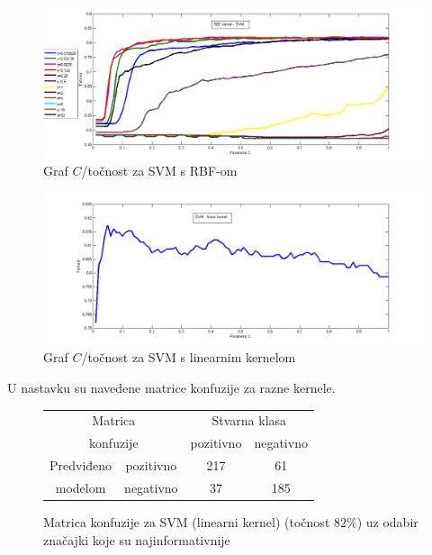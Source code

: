 \documentclass[conference]{IEEEtran}
\begin{document}
\begin{figure}[!ht]
\begin{minipage}{0.5\textwidth}
\centering
\includegraphics[width=\textwidth]{images/allRBF.png}
\caption{Graf $C$/točnost za SVM s RBF-om}
\end{minipage}
\end{figure}

\begin{figure}[!ht]
\begin{minipage}{0.5\textwidth}
\centering
\includegraphics[width=\textwidth]{images/paraCLinear.png}
\caption{Graf $C$/točnost za SVM s linearnim kernelom}
\end{minipage}
\end{figure}


U nastavku su navedene matrice konfuzije za razne kernele.

\begin{figure}[!ht]
\begin{minipage}{0.5\textwidth}
\centering
\begin{tabular}{|c|c|c|c|}
  \hline
  \multicolumn{2}{|c|}{Matrica}  & \multicolumn{2}{|c|}{Stvarna klasa} \\ 
  \cline{3-4}
  \multicolumn{2}{|c|}{konfuzije} & pozitivno & negativno \\ 
  \hline
  Predviđeno & pozitivno & 217 & 61 \\
  \cline{2-4}
  modelom & negativno & 37 & 185 \\
  \hline
\end{tabular}
\caption{Matrica konfuzije za SVM (linearni kernel) (točnost $82\%$) uz odabir značajki koje su najinformativnije}
\end{minipage}
\end{figure}
\end{document}
